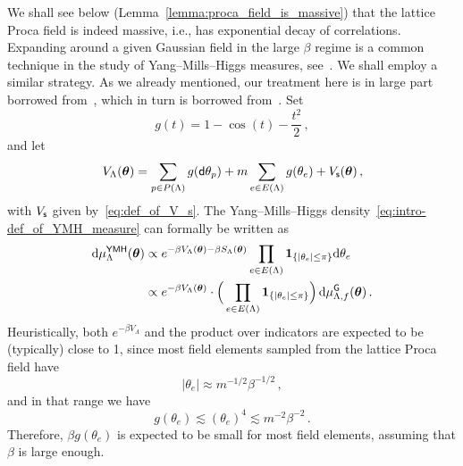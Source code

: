\documentclass[11pt]{article}
\theoremstyle{definition}
\theoremstyle{remark}
\numberwithin{theorem}{section}
\newcommand{\one}{\boldsymbol{1}}
\begin{document}
    We shall see below (Lemma~\ref{lemma:proca_field_is_massive}) that the lattice Proca field is indeed massive, i.e., has exponential decay of correlations. Expanding around a given Gaussian field in the large $\beta$ regime is a common technique in the study of Yang--Mills--Higgs measures, see~\cite{Balaban-Imbrie-Jaffe-Brydges, Frohlich-Spencer, Glimm-Jaffe-book, Glimm-Jaffe-Spencer, Osterwalder-Seiler}. We shall employ a similar strategy. As we already mentioned, our treatment here is in large part borrowed from~\cite{Balaban-Imbrie-Jaffe-Brydges}, which in turn is borrowed from~\cite{Glimm-Jaffe-Spencer}. Set
    \begin{equation*}
        g(t) = 1- \cos(t) - \frac{t^2}{2} \, ,
    \end{equation*}
    and let
    \begin{equation}
        \label{eq:def_of_V}
        V_{\Lambda}(\boldsymbol\theta) = \sum_{p\in P(\Lambda)} g({\sf d}\theta_p) + m \sum_{e\in E(\Lambda)} g(\theta_e)  + V_{{\sf s}}(\boldsymbol\theta)\, , 
    \end{equation}
    with $V_{{\sf s}}$ given by~\eqref{eq:def_of_V_s}.
    The Yang--Mills--Higgs density~\eqref{eq:intro-def_of_YMH_measure} can formally be written as
    \begin{align}
    \label{eq:heuristic_gaussian_approximation}
    \nonumber 
    {\rm d}\mu_{\Lambda}^{\sf YMH} (\boldsymbol{\theta}) &\propto e^{-\beta V_{\Lambda}(\boldsymbol{\theta}) - \beta S_{\Lambda}(\boldsymbol{\theta})} \prod_{e\in E(\Lambda)} \one_{\{|\theta_e|\le \pi \}}{\rm d}\theta_e \\ &\propto e^{-\beta V_{\Lambda}(\boldsymbol{\theta})}\cdot \Big(\prod_{e\in E(\Lambda)} \one_{\{|\theta_e|\le \pi \}} \Big) \, {\rm d}\mu_{\Lambda,f}^{\sf G}(\boldsymbol{\theta})  \, .
    \end{align}
    Heuristically, both $e^{-\beta V_{\Lambda}}$ and the product over indicators are expected to be (typically) close to 1, since most field elements sampled from the lattice Proca field have
    \[
    |\theta_e| \approx m^{-1/2} \beta^{-1/2}\, ,
    \]
    and in that range we have
    \[
    g(\theta_e) \lesssim (\theta_e)^{4} \lesssim m^{-2} \beta^{-2} \, .
    \]
    Therefore, $\beta g(\theta_e)$ is expected to be small for most field elements, assuming that $\beta$ is large enough. 
    
\end{document}
